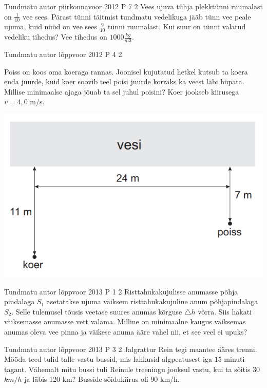 \documentclass[11pt]{article}
\begin{document}
{%
{Tundmatu autor} %
{piirkonnavoor} %
{2012} %
{P 7} %
{2} %
{
\ifStatement
Vees ujuva tühja plekktünni ruumalast on $\frac{1}{10}$ vee sees. Pärast tünni täitmist tundmatu vedelikuga jääb tünn vee peale ujuma, kuid nüüd on vee sees $\frac{9}{10}$ tünni ruumalast. Kui suur on tünni valatud vedeliku tihedus? Vee tihedus on $1000 \frac{kg}{m3}$.
\fi
}

{Tundmatu autor} %
{lõppvoor} %
{2012} %
{P 4} %
{2} %
{
\ifStatement
Poiss on koos oma koeraga rannas. Joonisel kujutatud hetkel kutsub ta koera enda juurde, kuid koer soovib teel poisi juurde korraks ka veest läbi hüpata. Millise minimaalse ajaga jõuab ta sel juhul poisini? Koer jookseb kiirusega $v = 4,0$ m/s.
\begin{center}
	\includegraphics[width=0.5\linewidth]{2012-v3p-04-yl.PNG}
\end{center}
\fi
}

{Tundmatu autor} %
{lõppvoor} %
{2013} %
{P 1} %
{2} %
{
\ifStatement
Risttahukakujulisse anumasse põhja pindalaga $S_1$ asetatakse ujuma väiksem risttahukakujuline anum põhjapindalaga $S_2$. Selle tulemusel tõusis veetase suures anumas kõrguse $\triangle h$ võrra. Siis hakati väiksemasse anumasse vett valama. Milline on minimaalne kaugus väiksemas anumas oleva vee pinna ja väikese anuma ääre vahel nii, et see veel ei upuks? 
\fi
}

{Tundmatu autor} %
{lõppvoor} %
{2013} %
{P 3} %
{2} %
{
\ifStatement
Jalgrattur Rein tegi maantee ääres trenni. Mööda teed tulid talle vastu bussid, mis lahkusid algpeatusest iga $15$ minuti tagant. Vähemalt mitu bussi tuli Reinule treeningu jooksul vastu, kui ta sõitis $30$ $km/h$ ja läbis 120 km? Busside sõidukiirus oli $90$ km/h.
\fi
}

}
\end{document}
